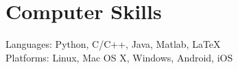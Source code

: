 \section{\sc Computer Skills}
Languages: Python, C/C++, Java, Matlab, \LaTeX\\
Platforms: Linux, Mac OS X, Windows, Android, iOS
